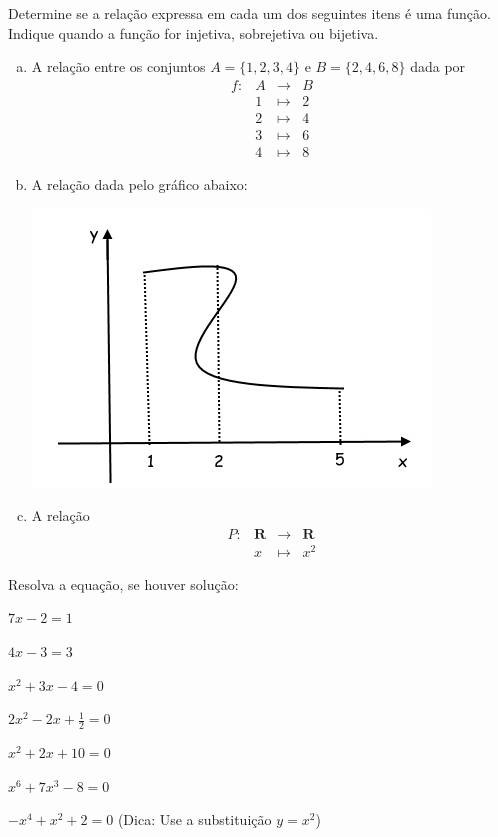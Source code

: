 \begin{secaoexercicio}

\begin{xca} Determine se a relação expressa em cada um dos seguintes itens é uma função. Indique quando a função for injetiva, sobrejetiva ou bijetiva.

\begin{enumerate}[(a)]
\item A relação entre os conjuntos $A=\{1,2,3,4\}$ e $B=\{2,4,6,8\}$ dada por
$$\begin{array}{crcl}
f:&A&\rightarrow&B\\
&1&\mapsto&2\\
&2&\mapsto&4\\
&3&\mapsto&6\\
&4&\mapsto&8
\end{array}$$

\item A relação dada pelo gráfico abaixo:

\begin{center}
\includegraphics[scale=0.8]{./chapters/preliminares/imgs/naofuncao}
\end{center}

\item A relação
$$\begin{array}{crcl}
P:&\mathbf{R}&\rightarrow& \mathbf{R} \\
&x&\mapsto& x^2\end{array}$$
\end{enumerate}

\end{xca}

\begin{xca}  Resolva a equação, se houver solução:
\begin{colexercicio}{3}
\item $7x-2=1$
\item $4x-3=3$
\item $x^2+3x-4=0$
\item $2x^2-2x+\frac{1}{2}=0$
\item $x^2+2x+10=0$
\item $x^6+7x^3-8=0$
\item $-x^4+x^2+2=0$ (Dica: Use a substituição $y=x^2$)
\end{colexercicio}
\end{xca}


\end{secaoexercicio}
